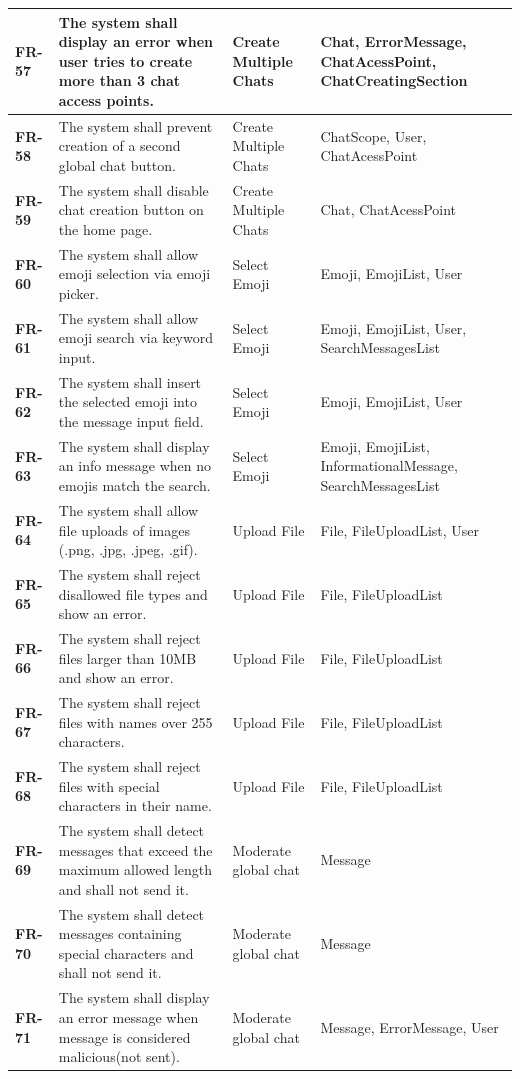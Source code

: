 \documentclass[]{VUMIFTemplateClass}
\begin{document}
\begin{longtable}{|p{3cm}|p{5.5cm}|l|p{4cm}|}
\hline
\textbf{FR-57} & The system shall display an error when user tries to create more than 3 chat access points. & Create Multiple Chats & Chat, ErrorMessage, ChatAcessPoint, ChatCreatingSection \\
\hline
\textbf{FR-58} & The system shall prevent creation of a second global chat button. & Create Multiple Chats & ChatScope, User, ChatAcessPoint \\
\hline
\textbf{FR-59} & The system shall disable chat creation button on the home page. & Create Multiple Chats & Chat, ChatAcessPoint \\
\hline
\textbf{FR-60} & The system shall allow emoji selection via emoji picker. & Select Emoji & Emoji, EmojiList, User \\
\hline
\textbf{FR-61} & The system shall allow emoji search via keyword input. & Select Emoji & Emoji, EmojiList, User, SearchMessagesList \\
\hline
\textbf{FR-62} & The system shall insert the selected emoji into the message input field. & Select Emoji & Emoji, EmojiList, User \\
\hline
\textbf{FR-63} & The system shall display an info message when no emojis match the search. & Select Emoji & Emoji, EmojiList, InformationalMessage, SearchMessagesList \\
\hline
\textbf{FR-64} & The system shall allow file uploads of images (.png, .jpg, .jpeg, .gif). & Upload File & File, FileUploadList, User \\
\hline
\textbf{FR-65} & The system shall reject disallowed file types and show an error. & Upload File & File, FileUploadList \\
\hline
\textbf{FR-66} & The system shall reject files larger than 10MB and show an error. & Upload File & File, FileUploadList \\
\hline
\textbf{FR-67} & The system shall reject files with names over 255 characters. & Upload File & File, FileUploadList \\
\hline
\textbf{FR-68} & The system shall reject files with special characters in their name. & Upload File & File, FileUploadList \\
\hline
\textbf{FR-69} & The system shall detect messages that exceed the maximum allowed length and shall not send it. &  Moderate global chat & Message \\
\hline
\textbf{FR-70} & The system shall detect messages containing special characters and shall not send it. & Moderate global chat & Message \\
\hline
\textbf{FR-71} & The system shall display an error message when message is considered malicious(not sent). & Moderate global chat & Message, ErrorMessage, User \\
\hline
\end{longtable}


\printbibliography[title = {References and sources}]
\end{document}
